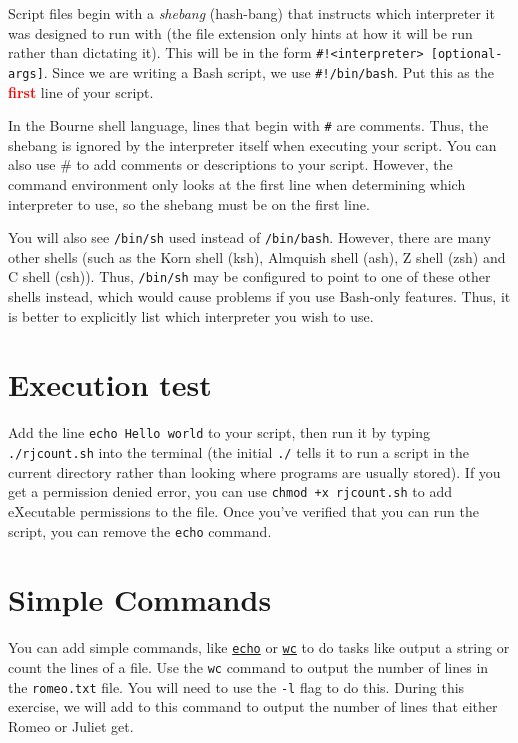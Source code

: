 \documentclass[12pt]{article}
\newcommand{\code}[1]{\texttt{#1}}
\newcommand{\filename}{\code{rjcount.sh}\xspace}
\begin{document}
Script files begin with a \emph{shebang} (hash-bang) that instructs which interpreter it was designed to run with (the file extension only hints at how it will be run rather than dictating it).
This will be in the form \code{\#!<interpreter> [optional-args]}.
Since we are writing a Bash script, we use \code{\#!/bin/bash}.
Put this as the \textbf{\textcolor{red}{first}} line of your script.

In the Bourne shell language, lines that begin with \code{\#} are comments.
Thus, the shebang is ignored by the interpreter itself when executing your script.
You can also use \# to add comments or descriptions to your script.
However, the command environment only looks at the first line when determining which interpreter to use, so the shebang must be on the first line.


You will also see \code{/bin/sh} used instead of \code{/bin/bash}.
However, there are many other shells (such as the Korn shell (ksh), Almquish shell (ash), Z shell (zsh) and C shell (csh)).
Thus, \code{/bin/sh} may be configured to point to one of these other shells instead, which would cause problems if you use Bash-only features.
Thus, it is better to explicitly list which interpreter you wish to use.

\section*{Execution test}
Add the line \code{echo Hello world} to your script, then run it by typing \code{./\filename} into the terminal 
(the initial \code{./} tells it to run a script in the current directory rather than looking where programs are usually stored).
If you get a permission denied error, you can use \code{chmod +x \filename} to add eXecutable permissions to the file.
Once you've verified that you can run the script, you can remove the \code{echo} command.

\section*{Simple Commands}
You can add simple commands, like \href{https://en.wikipedia.org/wiki/Echo_(command)}{\code{echo}} or \href{https://en.wikipedia.org/wiki/Wc_(Unix)}{\code{wc}} to do tasks like output a string or count the lines of a file.
Use the \code{wc} command to output the number of lines in the \code{romeo.txt} file.
You will need to use the \code{-l} flag to do this.
During this exercise, we will add to this command to output the number of lines that either Romeo or Juliet get.
\end{document}

